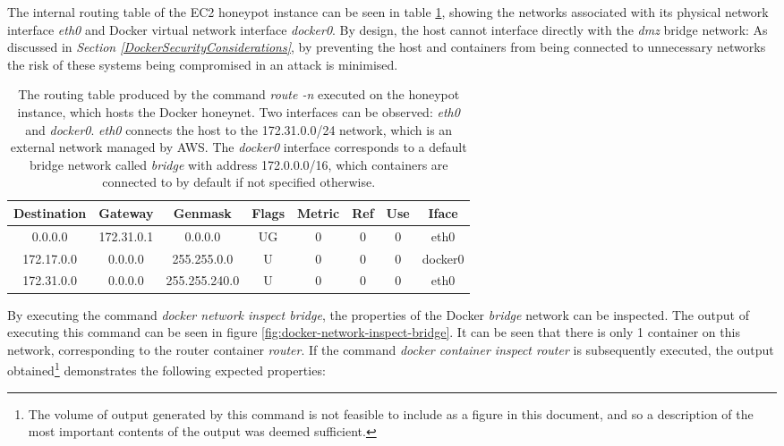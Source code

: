 The internal routing table of the EC2 honeypot instance can be seen in table \ref{table:host-routing-table}, showing the networks associated with its physical network interface \textit{eth0} and Docker virtual network interface \textit{docker0}. By design, the host cannot interface directly with the \textit{dmz} bridge network: As discussed in \textit{Section \ref{DockerSecurityConsiderations}}, by preventing the host and containers from being connected to unnecessary networks the risk of these systems being compromised in an attack is minimised.

\begin{table}[!h]
	\begin{center}
		\begin{tabular}{|c|c|c|c|c|c|c|c|} 
			\hline
			\bf Destination  & \bf Gateway  & \bf Genmask  & \bf Flags & \bf Metric & \bf Ref & \bf Use & \bf Iface \\
			\hline
			0.0.0.0 & 172.31.0.1 & 0.0.0.0 & UG & 0 & 0 & 0 & eth0  \\
            172.17.0.0 & 0.0.0.0 & 255.255.0.0 & U & 0 & 0 & 0 & docker0  \\
            172.31.0.0 & 0.0.0.0 & 255.255.240.0& U & 0 & 0 & 0 & eth0  \\
			\hline
		\end{tabular}
	\end{center}
	\caption[Routing Table of the EC2 Honeypot Instance]{The routing table produced by the command \textit{route -n} executed on the honeypot instance, which hosts the Docker honeynet. Two interfaces can be observed: \textit{eth0} and \textit{docker0}. \textit{eth0} connects the host to the 172.31.0.0/24 network, which is an external network managed by AWS. The \textit{docker0} interface corresponds to a default bridge network called \textit{bridge} with address 172.0.0.0/16, which containers are connected to by default if not specified otherwise.}	
	\label{table:host-routing-table}
\end{table}

By executing the command \textit{docker network inspect bridge}, the properties of the Docker \textit{bridge} network can be inspected. The output of executing this command can be seen in figure \ref{fig:docker-network-inspect-bridge}. It can be seen that there is only 1 container on this network, corresponding to the router container \textit{router}. If the command \textit{docker container inspect router} is subsequently executed, the output obtained\footnote{The volume of output generated by this command is not feasible to include as a figure in this document, and so a description of the most important contents of the output was deemed sufficient.} demonstrates the following expected properties:

